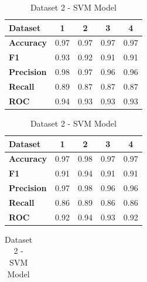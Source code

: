\begin{table}[H]
  \centering
  \caption{SVM model cross-performance results}\label{tab:svm_model_cross-performance_results}
  \begin{subtable}[H]{0.45\textwidth}
    \centering
    \begin{tabular}{|l|c|c|c|c|}
      \hline
      \textbf{Dataset}   & \textbf{1} & \textbf{2} & \textbf{3} & \textbf{4} \\
      \hline
      \textbf{Accuracy}  & 0.97       & 0.97       & 0.97       & 0.97       \\
      \textbf{F1}        & 0.93       & 0.92       & 0.91       & 0.91       \\
      \textbf{Precision} & 0.98       & 0.97       & 0.96       & 0.96       \\
      \textbf{Recall}    & 0.89       & 0.87       & 0.87       & 0.87       \\
      \textbf{ROC}       & 0.94       & 0.93       & 0.93       & 0.93       \\
      \hline
    \end{tabular}
    \caption{Dataset 1 - SVM Model}\label{subtab:dataset_1_svm_model}
  \end{subtable}
  \quad
  \begin{subtable}[H]{0.45\textwidth}
    \centering
    \begin{tabular}{|l|c|c|c|c|}
      \hline
      \textbf{Dataset}   & \textbf{1} & \textbf{2} & \textbf{3} & \textbf{4} \\
      \hline
      \textbf{Accuracy}  & 0.97       & 0.98       & 0.97       & 0.97       \\
      \textbf{F1}        & 0.91       & 0.94       & 0.91       & 0.91       \\
      \textbf{Precision} & 0.97       & 0.98       & 0.96       & 0.96       \\
      \textbf{Recall}    & 0.86       & 0.89       & 0.86       & 0.86       \\
      \textbf{ROC}       & 0.92       & 0.94       & 0.93       & 0.92       \\
      \hline
    \end{tabular}
    \caption{Dataset 2 - SVM Model}\label{subtab:dataset_2_svm_model}
  \end{subtable}
  \quad
  \begin{subtable}[H]{0.45\textwidth}
    \centering
    \begin{tabular}{|l|c|c|c|c|}

\end{tabular}
\end{subtable}
\end{table}
